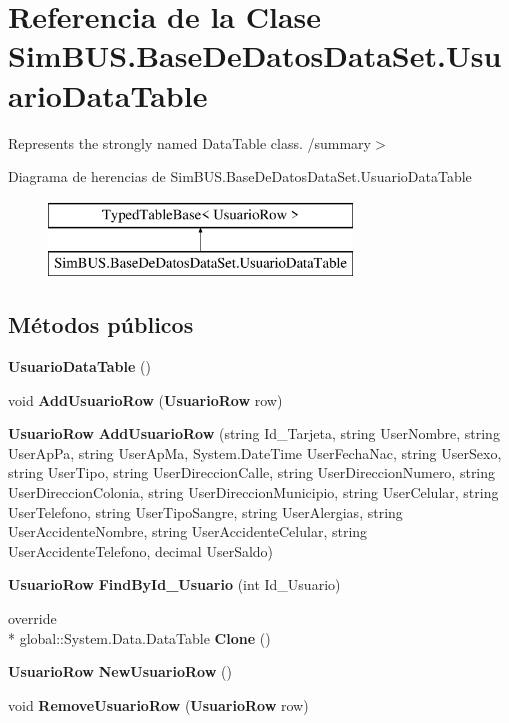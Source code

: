\section{Referencia de la Clase Sim\-B\-U\-S.\-Base\-De\-Datos\-Data\-Set.\-Usuario\-Data\-Table}
\label{class_sim_b_u_s_1_1_base_de_datos_data_set_1_1_usuario_data_table}


Represents the strongly named Data\-Table class. /summary$>$  


Diagrama de herencias de Sim\-B\-U\-S.\-Base\-De\-Datos\-Data\-Set.\-Usuario\-Data\-Table\begin{figure}[H]
\begin{center}
\leavevmode
\includegraphics[height=2.000000cm]{class_sim_b_u_s_1_1_base_de_datos_data_set_1_1_usuario_data_table}
\end{center}
\end{figure}
\subsection*{Métodos públicos}
\begin{DoxyCompactItemize}
\item 
{\bf Usuario\-Data\-Table} ()
\item 
void {\bf Add\-Usuario\-Row} ({\bf Usuario\-Row} row)
\item 
{\bf Usuario\-Row} {\bf Add\-Usuario\-Row} (string Id\-\_\-\-Tarjeta, string User\-Nombre, string User\-Ap\-Pa, string User\-Ap\-Ma, System.\-Date\-Time User\-Fecha\-Nac, string User\-Sexo, string User\-Tipo, string User\-Direccion\-Calle, string User\-Direccion\-Numero, string User\-Direccion\-Colonia, string User\-Direccion\-Municipio, string User\-Celular, string User\-Telefono, string User\-Tipo\-Sangre, string User\-Alergias, string User\-Accidente\-Nombre, string User\-Accidente\-Celular, string User\-Accidente\-Telefono, decimal User\-Saldo)
\item 
{\bf Usuario\-Row} {\bf Find\-By\-Id\-\_\-\-Usuario} (int Id\-\_\-\-Usuario)
\item 
override \\*
global\-::\-System.\-Data.\-Data\-Table {\bf Clone} ()
\item 
{\bf Usuario\-Row} {\bf New\-Usuario\-Row} ()
\item 
void {\bf Remove\-Usuario\-Row} ({\bf Usuario\-Row} row)
\end{DoxyCompactItemize}
